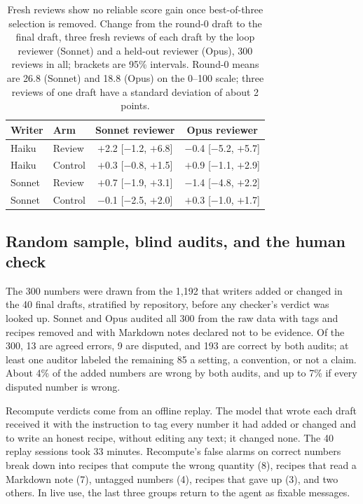 \begin{table}[h]
  \centering
  \caption{Fresh reviews show no reliable score gain once best-of-three selection is removed. Change from the round-0
  draft to the final draft, three fresh reviews of each draft by the loop reviewer (Sonnet) and a held-out reviewer
  (Opus), 300 reviews in all; brackets are 95\% intervals. Round-0 means are 26.8 (Sonnet) and 18.8 (Opus) on the
  0--100 scale; three reviews of one draft have a standard deviation of about 2 points.}
  \label{tab:rescore}
  \small
  \begin{tabular}{@{}llcc@{}}
    \toprule
    \rowcolor{headgray}
    Writer & Arm & Sonnet reviewer & Opus reviewer \\
    \midrule
    Haiku  & Review  & $+$2.2 [$-$1.2, $+$6.8] & $-$0.4 [$-$5.2, $+$5.7] \\
    Haiku  & Control & $+$0.3 [$-$0.8, $+$1.5] & $+$0.9 [$-$1.1, $+$2.9] \\
    Sonnet & Review  & $+$0.7 [$-$1.9, $+$3.1] & $-$1.4 [$-$4.8, $+$2.2] \\
    Sonnet & Control & $-$0.1 [$-$2.5, $+$2.0] & $+$0.3 [$-$1.0, $+$1.7] \\
    \bottomrule
  \end{tabular}
\end{table}

\subsection{Random sample, blind audits, and the human check}
\label{app:audit}

The 300 numbers were drawn from the 1,192 that writers added or changed in the 40 final drafts, stratified by
repository, before any checker's verdict was looked up. Sonnet and Opus audited all 300 from the raw data with tags
and recipes removed and with Markdown notes declared not to be evidence. Of the 300, 13 are agreed errors, 9 are
disputed, and 193 are correct by both audits; at least one auditor labeled the remaining 85 a setting, a convention,
or not a claim. About 4\% of the added numbers are wrong by both audits, and up to 7\% if every disputed number is
wrong.

Recompute verdicts come from an offline replay. The model that wrote each draft received it with the instruction to
tag every number it had added or changed and to write an honest recipe, without editing any text; it changed none.
The 40 replay sessions took 33 minutes. Recompute's false alarms on correct numbers break down into recipes that
compute the wrong quantity (8), recipes that read a Markdown note (7), untagged numbers (4), recipes that gave up (3),
and two others. In live use, the last three groups return to the agent as fixable messages.

